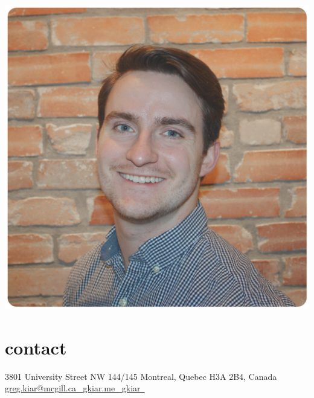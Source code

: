 \documentclass[]{friggeri-cv} %
\begin{document}


\begin{aside} %
\includegraphics[width=\textwidth]{./headshot_shorthair.png}
\section{contact}
3801 University Street
NW 144/145
Montreal, Quebec
H3A 2B4, Canada
~
\href{mailto:gkiar07@gmail.com}{greg.kiar@mcgill.ca~{\color{red} \faEnvelope}}
\href{http://gkiar.github.io}{gkiar.me~{\color{lightblue} \faGlobe}}
\href{http://github.com/gkiar}{gkiar~{\color{purple} \faGithub}}
\href{https://twitter.com/g_kiar}{{\color{blue} \faTwitter}} \href{https://www.linkedin.com/in/gregkiar}{{\color{green} \faLinkedin}} \href{https://publons.com/author/1305375/gregory-kiar#profile}{{\color{plubblue} \aiPublons}} \href{http://orcid.org/0000-0001-8915-496X}{{\color{orcidgreen} \aiOrcid}} \href{https://scholar.google.com/citations?user=ztw6g7kAAAAJ&hl=en}{{\color{googred} \aiGoogleScholar}} \href{https://www.researchgate.net/profile/Gregory_Kiar}{{\color{gateteal} \aiResearchGate}}

\end{aside}
\end{document}
